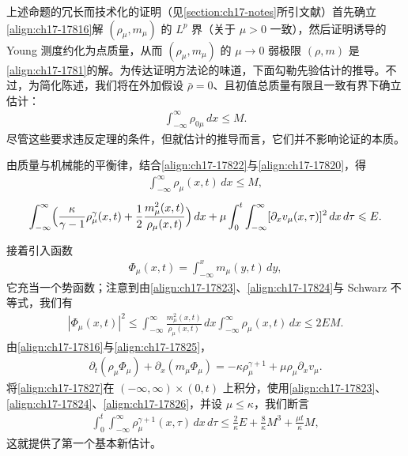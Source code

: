 \documentclass[../../main.tex]{subfiles}
\begin{document}
上述命题的冗长而技术化的证明（见\cref{section:ch17-notes}所引文献）首先确立\eqref{align:ch17-17816}解 $(\rho_\mu,m_\mu)$ 的 $L^p$ 界（关于 $\mu>0$ 一致），然后证明诱导的 Young 测度约化为点质量，从而 $(\rho_\mu,m_\mu)$ 的 $\mu\to0$ 弱极限 $(\rho,m)$ 是\eqref{align:ch17-1781}的解。为传达证明方法论的味道，下面勾勒先验估计的推导。不过，为简化陈述，我们将在外加假设 $\bar\rho=0$、且初值总质量有限且一致有界下确立估计：
\begin{align}
\int_{-\infty}^\infty\rho_{0\mu}\,dx\leqslant M.
\label{align:ch17-17822}
\end{align}
尽管这些要求违反定理的条件，但就估计的推导而言，它们并不影响论证的本质。

由质量与机械能的平衡律，结合\eqref{align:ch17-17822}与\eqref{align:ch17-17820}，得
\begin{align}
\int_{-\infty}^\infty\rho_\mu(x,t)\,dx\leqslant M,
\label{align:ch17-17823}
\end{align}
\begin{align}
\int_{-\infty}^\infty\Bigl(\frac{\kappa}{\gamma-1}\rho_\mu^\gamma(x,t)+\frac{1}{2}\frac{m_\mu^2(x,t)}{\rho_\mu(x,t)}\Bigr)\,dx+\mu\int_0^t\int_{-\infty}^\infty[\partial_xv_\mu(x,\tau)]^2\,dx\,d\tau\leqslant E.
\label{align:ch17-17824}
\end{align}

接着引入函数
\begin{align}
\Phi_\mu(x,t)=\int_{-\infty}^x m_\mu(y,t)\,dy,
\label{align:ch17-17825}
\end{align}
它充当一个势函数；注意到由\eqref{align:ch17-17823}、\eqref{align:ch17-17824}与 Schwarz 不等式，我们有
\begin{align}
|\Phi_\mu(x,t)|^2\leqslant\int_{-\infty}^\infty\frac{m_\mu^2(x,t)}{\rho_\mu(x,t)}\,dx\int_{-\infty}^\infty\rho_\mu(x,t)\,dx\leqslant 2EM.
\label{align:ch17-17826}
\end{align}
由\eqref{align:ch17-17816}与\eqref{align:ch17-17825}，
\begin{align}
\partial_t(\rho_\mu\Phi_\mu)+\partial_x(m_\mu\Phi_\mu)=-\kappa\rho_\mu^{\gamma+1}+\mu\rho_\mu\partial_xv_\mu.
\label{align:ch17-17827}
\end{align}
将\eqref{align:ch17-17827}在 $(-\infty,\infty)\times(0,t)$ 上积分，使用\eqref{align:ch17-17823}、\eqref{align:ch17-17824}、\eqref{align:ch17-17826}，并设 $\mu\leqslant\kappa$，我们断言
\begin{align}
\int_0^t\int_{-\infty}^\infty\rho_\mu^{\gamma+1}(x,\tau)\,dx\,d\tau\leqslant\frac{2}{\kappa}E+\frac{8}{\kappa}M^3+\frac{\mu t}{\kappa}M,
\label{align:ch17-17828}
\end{align}
这就提供了第一个基本新估计。
\end{document}
